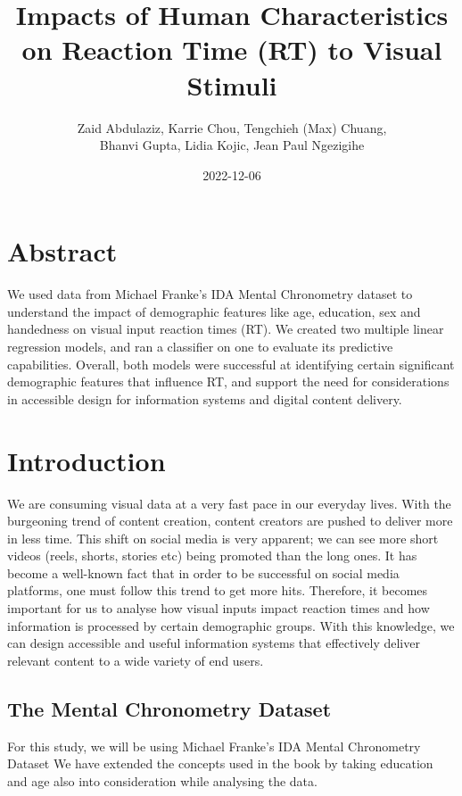 \documentclass[
]{article}
\title{Impacts of Human Characteristics on Reaction Time (RT) to Visual
Stimuli}
\author{Zaid Abdulaziz, Karrie Chou, Tengchieh (Max) Chuang,\\
Bhanvi Gupta, Lidia Kojic, Jean Paul Ngezigihe}
\date{2022-12-06}
\begin{document}
\maketitle

\scriptsize

\hypertarget{abstract}{%
\section{Abstract}\label{abstract}}

We used data from Michael Franke's IDA Mental Chronometry dataset to
understand the impact of demographic features like age, education, sex
and handedness on visual input reaction times (RT). We created two
multiple linear regression models, and ran a classifier on one to
evaluate its predictive capabilities. Overall, both models were
successful at identifying certain significant demographic features that
influence RT, and support the need for considerations in accessible
design for information systems and digital content delivery.

\hypertarget{introduction}{%
\section{Introduction}\label{introduction}}

We are consuming visual data at a very fast pace in our everyday lives.
With the burgeoning trend of content creation, content creators are
pushed to deliver more in less time. This shift on social media is very
apparent; we can see more short videos (reels, shorts, stories etc)
being promoted than the long ones. It has become a well-known fact that
in order to be successful on social media platforms, one must follow
this trend to get more hits. Therefore, it becomes important for us to
analyse how visual inputs impact reaction times and how information is
processed by certain demographic groups. With this knowledge, we can
design accessible and useful information systems that effectively
deliver relevant content to a wide variety of end users.

\hypertarget{the-mental-chronometry-dataset}{%
\subsection{The Mental Chronometry
Dataset}\label{the-mental-chronometry-dataset}}

For this study, we will be using Michael Franke's IDA Mental Chronometry
Dataset We have extended the concepts used in the book by taking
education and age also into consideration while analysing the data.
\end{document}
